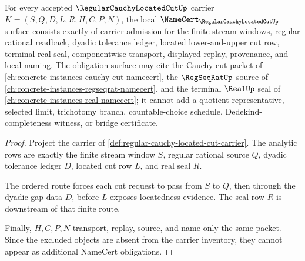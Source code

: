 \begin{theorem}
\label{thm:regular-cauchy-located-cut-namecert-obligations}
For every accepted $\RegularCauchyLocatedCutUp$ carrier $K=(S,Q,D,L,R,H,C,P,N)$, the local $\NameCert_{\RegularCauchyLocatedCutUp}$ surface consists exactly of carrier admission for the finite stream windows, regular rational readback, dyadic tolerance ledger, located lower-and-upper cut row, terminal real seal, componentwise transport, displayed replay, provenance, and local naming. The obligation surface may cite the Cauchy-cut packet of \autoref{ch:concrete-instances-cauchy-cut-namecert}, the $\RegSeqRatUp$ source of \autoref{ch:concrete-instances-regseqrat-namecert}, and the terminal $\RealUp$ seal of \autoref{ch:concrete-instances-real-namecert}; it cannot add a quotient representative, selected limit, trichotomy branch, countable-choice schedule, Dedekind-completeness witness, or bridge certificate.
\end{theorem}
\begin{proof}
Project the carrier of \autoref{def:regular-cauchy-located-cut-carrier}. The analytic rows are exactly the finite stream window $S$, regular rational source $Q$, dyadic tolerance ledger $D$, located cut row $L$, and real seal $R$.

The ordered route forces each cut request to pass from $S$ to $Q$, then through the dyadic gap data $D$, before $L$ exposes locatedness evidence. The seal row $R$ is downstream of that finite route.

Finally, $H,C,P,N$ transport, replay, source, and name only the same packet. Since the excluded objects are absent from the carrier inventory, they cannot appear as additional NameCert obligations.
\end{proof}

